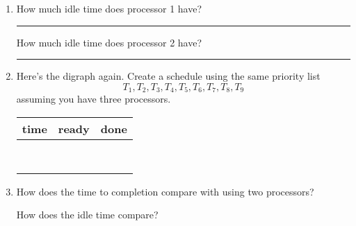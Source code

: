 \documentclass[12pt]{article}
\newcommand{\ans}[1][1in]{\rule{#1}{.5pt}}
\begin{document}
\begin{enumerate}
\item How much idle time does processor 1 have? \ans 

How much idle time does processor 2 have? \ans

\newpage

\item Here's the digraph again. Create a schedule using the same priority list \[T_{1}, T_{2}, T_{3}, T_{4}, T_{5}, T_{6}, T_{7}, T_{8}, T_{9}\] assuming you have three processors.


\begin{adjustbox}{valign=t,minipage={.4\textwidth}}
\mydigraph
\end{adjustbox}
\begin{adjustbox}{valign=t,minipage={.4\textwidth}}
\begin{tabular}{c | c | c}
time & ready & done \\ \hline
&&\\&&\\&&\\&&\\&&\\&&\\&&\\&&\\
\end{tabular}
\end{adjustbox}



\item How does the time to completion compare with using two processors?

\vspace{.5cm}

How does the idle time compare? \vspace{.5cm}


\end{enumerate}
\end{document}

